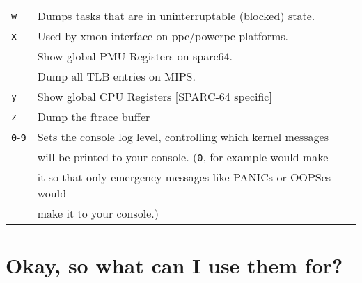 \documentclass[article,letterpaper]{memoir}
\let\subsection\section
\let\section\chapter
\begin{document}
\begin{longtable}[]{@{}ll@{}}
\texttt{w} & Dumps tasks that are in uninterruptable (blocked)
state.\tabularnewline
\texttt{x} & Used by xmon interface on ppc/powerpc
platforms.\tabularnewline
& Show global PMU Registers on sparc64.\tabularnewline
& Dump all TLB entries on MIPS.\tabularnewline
\texttt{y} & Show global CPU Registers {[}SPARC-64
specific{]}\tabularnewline
\texttt{z} & Dump the ftrace buffer\tabularnewline
\texttt{0}-\texttt{9} & Sets the console log level, controlling which
kernel messages\tabularnewline
& will be printed to your console. (\texttt{0}, for example would
make\tabularnewline
& it so that only emergency messages like PANICs or OOPSes
would\tabularnewline
& make it to your console.)\tabularnewline
\bottomrule
\end{longtable}

\clearpage
\subsection{Okay, so what can I use them
for?}\label{okay-so-what-can-i-use-them-for}
\end{document}
